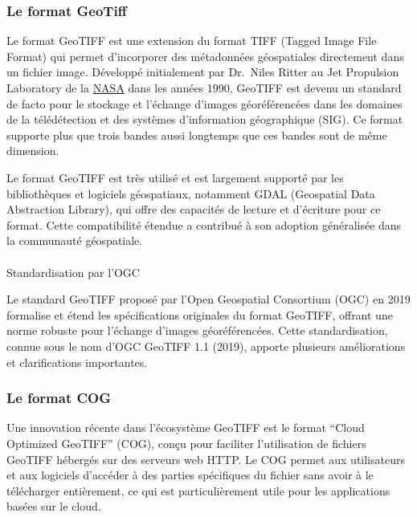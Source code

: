 \documentclass[
  letterpaper,
  DIV=11,
  numbers=noendperiod]{scrreprt}
\makeatletter
\let\oldparagraph\paragraph
\renewcommand{\paragraph}{
    \@ifstar
      \xxxParagraphStar
      \xxxParagraphNoStar
  }
\newcommand{\xxxParagraphStar}[1]{\oldparagraph*{#1}\mbox{}}
\newcommand{\xxxParagraphNoStar}[1]{\oldparagraph{#1}\mbox{}}
\makeatother
\begin{document}
\subsubsection{Le format GeoTiff}\label{sec-01122}

Le format GeoTIFF est une extension du format TIFF (Tagged Image File
Format) qui permet d'incorporer des métadonnées géospatiales directement
dans un fichier image. Développé initialement par Dr.~Niles Ritter au
Jet Propulsion Laboratory de la
\href{https://www.earthdata.nasa.gov/esdis/esco/standards-and-practices/geotiff}{NASA}
dans les années 1990, GeoTIFF est devenu un standard de facto pour le
stockage et l'échange d'images géoréférencées dans les domaines de la
télédétection et des systèmes d'information géographique (SIG). Ce
format supporte plus que trois bandes aussi longtemps que ces bandes
sont de même dimension.

Le format GeoTIFF est très utilisé et est largement supporté par les
bibliothèques et logiciels géospatiaux, notamment GDAL (Geospatial Data
Abstraction Library), qui offre des capacités de lecture et d'écriture
pour ce format. Cette compatibilité étendue a contribué à son adoption
généralisée dans la communauté géospatiale.

\paragraph{Standardisation par l'OGC}\label{sec-011221}

Le standard GeoTIFF proposé par l'Open Geospatial Consortium (OGC) en
2019 formalise et étend les spécifications originales du format GeoTIFF,
offrant une norme robuste pour l'échange d'images géoréférencées. Cette
standardisation, connue sous le nom d'OGC GeoTIFF 1.1 (2019), apporte
plusieurs améliorations et clarifications importantes.

\subsubsection{Le format COG}\label{le-format-cog}

Une innovation récente dans l'écosystème GeoTIFF est le format ``Cloud
Optimized GeoTIFF'' (COG), conçu pour faciliter l'utilisation de
fichiers GeoTIFF hébergés sur des serveurs web HTTP. Le COG permet aux
utilisateurs et aux logiciels d'accéder à des parties spécifiques du
fichier sans avoir à le télécharger entièrement, ce qui est
particulièrement utile pour les applications basées sur le cloud.
\end{document}
